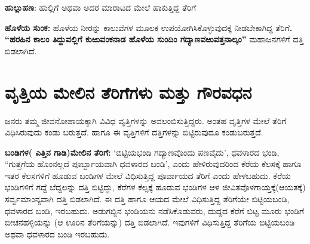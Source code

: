 \textbf{ಹುಲ್ಲುಹಣ}: ಹುಲ್ಲಿಗೆ ಅಥವಾ ಅದರ ಮಾರಾಟದ ಮೇಲೆ ಹಾಕುತ್ತಿದ್ದ ತೆರಿಗೆ

\textbf{ಹೊಳೆಯ ಸುಂಕ: } ಹೊಳೆಯ ನೀರನ್ನು ಕಾಲುವೆಗಳ ಮೂಲಕ ಉಪಯೋಗಿಸಿಕೊಳ್ಳುವುದಕ್ಕೆ ನೀಡಬೇಕಾಗಿದ್ದ ತೆರಿಗೆ\textbf{. “ಹರಹಿನ ಕಾಲಂ ತಿದ್ದುವಲ್ಲಿಗೆ ಕುಱುವಂಕನಾಡ ಹೊಳೆಯ ಸುಂದಿಂ ಗದ್ಯಾಣವಱುವತ್ತನಾಲ್ಕಂ” }ಮಹಾಜನಗಳಿಗೆ ದತ್ತಿ ಬಿಡಲಾಗಿದೆ.


\section{ವೃತ್ತಿಯ ಮೇಲಿನ ತೆರಿಗೆಗಳು ಮತ್ತು ಗೌರವಧನ}

ಜನರು ತಮ್ಮ ಜೀವನೋಪಾಯಕ್ಕಾಗಿ ವಿವಿಧ ವೃತ್ತಿಗಳನ್ನು ಅವಲಂಬಿಸುತ್ತಿದ್ದರು. ಅಂತಹ ವೃತ್ತಿಗಳ ಮೇಲೆ ತೆರಿಗೆ ವಿಧಿಸಿರುವುದು ಕಂಡು ಬರುತ್ತದೆ. ಹಾಗೂ ಈ ವೃತ್ತಿಗಳಿಗೆ ದತ್ತಿಗಳನ್ನು ಬಿಟ್ಟಿರುವುದೂ ಕಂಡುಬರುತ್ತದೆ.

\textbf{ಬಂಡಿಗಳ( ಎತ್ತಿನ ಗಾಡಿ)ಮೇಲಿನ ತೆರಿಗೆ: } ‘ಬಿಟ್ಟಿಯಭಂಡಿ ಗದ್ಯಾಣವೊಂದು ಪಣವೈದು’, ಧವಳಾರದ ಭಂಡಿ, “ಗುತ್ತಗೆಯ ಹೊಂನಲ್ಲದೆ ಪೂರ್ಬ್ಬಾಯವಾಗಿ ಧವಳಾರದ ಬಂಡಿ’, ಎಂದು ಹೇಳಿರುವುದರಿಂದ ಕೆರೆಯ ಕೆಲಸಕ್ಕೆ ಹಾಗೂ ಇತರ ಕೆಲಸಗಳಿಗೆ ಹೂಡುವ ಬಂಡಿಗಳ ಮೇಲೆ ವಿಧಿಸುತ್ತಿದ್ದ ಪೂರ್ವಾಯದ ತೆರಿಗೆ ಎಂದು ಹೇಳಬಹುದು. ಕೆರೆಯ ಭಂಡಿಗಳಿಗೆ ಗದ್ದೆ ಬೆದ್ದಲನ್ನು ದತ್ತಿ ಬಿಟ್ಟಿದ್ದು, ಕೆರೆಗಳ ಕೆಲ್ಸಕ್ಕೆ ಹೂಡುವ ಭಂಡಿಗಳ ಆಳ ಜೀವಿತವೊಳಗಾಯ್ತಕ್ಕೆ(ಆಯತಕ್ಕೆ) ಸರ್ವ್ವಮಾಂನ್ಯವಾಗಿ ದತ್ತಿ ಬಿಡಲಾಗಿದೆ. ಈ ದತ್ತಿ ಹಾಗೂ ಆಯದ ಮೇಲೆ ವಿಧಿಸುತ್ತಿದ್ದ ತೆರಿಗೆಯೇ ಬಿಟ್ಟಿಯಬಂಡಿ, ಧವಳಾರದ ಬಂಡಿ, ಇರಬಹುದು. ಅಡುಗಬ್ಬಿನ ಭಂಡಿಯನು ನಡೆಸಿಕೊಡುವರು, ದುದ್ದದ ಕೆರೆಗೆ ಬಿಟ್ಟ ಮೂರು ಭಂಡಿಗೆ ಬೀಚನಹಳ್ಳಿಯನ್ನು (ಆ ಊರಿನ ತೆರಿಗೆಯನ್ನು) ದತ್ತಿ ಬಿಡಲಾಗಿದೆ. ಇವುಗಳಿಗೆ ವಿಧಿಸುತ್ತಿದ್ದ ತೆರಿಗೆಯ ಬಿಟ್ಟಿಯಬಂಡಿ ಅಥವಾ ಧವಳಾರದ ಬಂಡಿ ಇರಬಹುದು.

